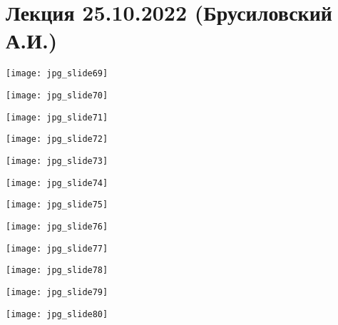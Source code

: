 \documentclass[main.tex]{subfiles}
\begin{document}
\section{Лекция 25.10.2022 (Брусиловский А.И.)}

\begin{center}
\texttt{[image: jpg\_slide69]}
\end{center}

\begin{center}
\texttt{[image: jpg\_slide70]}
\end{center}

\begin{center}
\texttt{[image: jpg\_slide71]}
\end{center}

\begin{center}
\texttt{[image: jpg\_slide72]}
\end{center}

\begin{center}
\texttt{[image: jpg\_slide73]}
\end{center}

\begin{center}
\texttt{[image: jpg\_slide74]}
\end{center}

\begin{center}
\texttt{[image: jpg\_slide75]}
\end{center}

\begin{center}
\texttt{[image: jpg\_slide76]}
\end{center}

\begin{center}
\texttt{[image: jpg\_slide77]}
\end{center}

\begin{center}
\texttt{[image: jpg\_slide78]}
\end{center}

\begin{center}
\texttt{[image: jpg\_slide79]}
\end{center}

\begin{center}
\texttt{[image: jpg\_slide80]}
\end{center}
\end{document}
